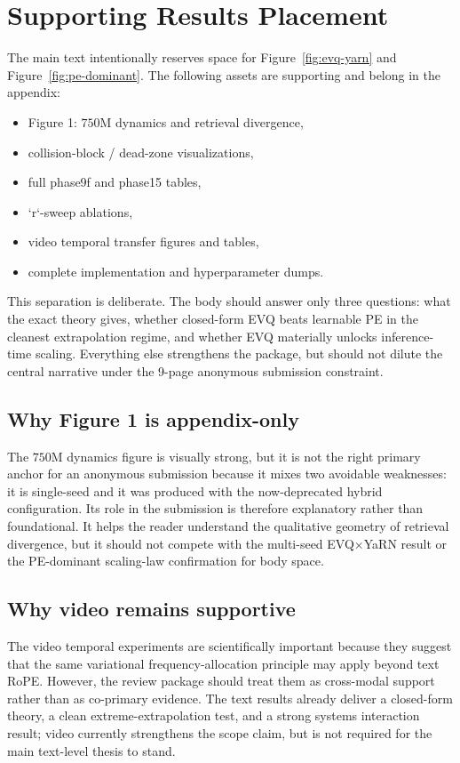 \section{Supporting Results Placement}

The main text intentionally reserves space for Figure~\ref{fig:evq-yarn} and Figure~\ref{fig:pe-dominant}. The following assets are supporting and belong in the appendix:
\begin{itemize}
\item Figure 1: \(750\mathrm{M}\) dynamics and retrieval divergence,
\item collision-block / dead-zone visualizations,
\item full phase9f and phase15 tables,
\item `r`-sweep ablations,
\item video temporal transfer figures and tables,
\item complete implementation and hyperparameter dumps.
\end{itemize}

This separation is deliberate. The body should answer only three questions: what the exact theory gives, whether closed-form EVQ beats learnable PE in the cleanest extrapolation regime, and whether EVQ materially unlocks inference-time scaling. Everything else strengthens the package, but should not dilute the central narrative under the 9-page anonymous submission constraint.

\subsection{Why Figure 1 is appendix-only}

The \(750\mathrm{M}\) dynamics figure is visually strong, but it is not the right primary anchor for an anonymous submission because it mixes two avoidable weaknesses: it is single-seed and it was produced with the now-deprecated hybrid configuration. Its role in the submission is therefore explanatory rather than foundational. It helps the reader understand the qualitative geometry of retrieval divergence, but it should not compete with the multi-seed EVQ\(\times\)YaRN result or the PE-dominant scaling-law confirmation for body space.

\subsection{Why video remains supportive}

The video temporal experiments are scientifically important because they suggest that the same variational frequency-allocation principle may apply beyond text RoPE. However, the review package should treat them as cross-modal support rather than as co-primary evidence. The text results already deliver a closed-form theory, a clean extreme-extrapolation test, and a strong systems interaction result; video currently strengthens the scope claim, but is not required for the main text-level thesis to stand.

